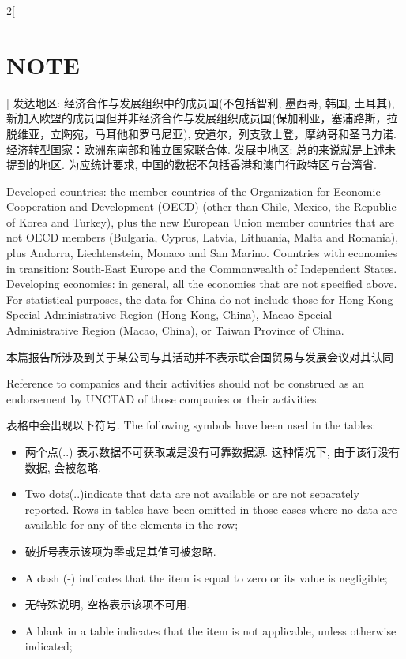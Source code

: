 \documentclass[a4paper, UTF8, 12pt]{article}
\begin{document}
\begin{paracol}{2}[\section{NOTE}]
    \switchcolumn*
    发达地区: 经济合作与发展组织中的成员国(不包括智利, 墨西哥, 韩国, 土耳其), 新加入欧盟的成员国但并非经济合作与发展组织成员国(保加利亚，塞浦路斯，拉脱维亚，立陶宛，马耳他和罗马尼亚), 安道尔，列支敦士登，摩纳哥和圣马力诺. 经济转型国家：欧洲东南部和独立国家联合体.
    发展中地区: 总的来说就是上述未提到的地区. 为应统计要求, 中国的数据不包括香港和澳门行政特区与台湾省.


    \switchcolumn
    Developed countries: the member countries of the Organization for Economic Cooperation and Development (OECD) (other than Chile, Mexico, the Republic of Korea and Turkey), plus the new European Union member countries that are not OECD members (Bulgaria, Cyprus, Latvia, Lithuania, Malta and Romania), plus Andorra, Liechtenstein, Monaco and San Marino. Countries with economies in transition: South-East Europe and the Commonwealth of Independent States. Developing economies: in general, all the economies that are not specified above. For statistical purposes, the data for China do not include those for Hong Kong Special Administrative Region (Hong Kong, China), Macao Special Administrative Region (Macao, China), or Taiwan Province of China. 

    \switchcolumn*
    本篇报告所涉及到关于某公司与其活动并不表示联合国贸易与发展会议对其认同

    \switchcolumn
    Reference to companies and their activities should not be construed as an endorsement by UNCTAD of those companies or their activities.

    \switchcolumn*
    表格中会出现以下符号.
    \switchcolumn
    The following symbols have been used in the tables: 

    \begin{itemize}
        \switchcolumn*
        \item 两个点(..) 表示数据不可获取或是没有可靠数据源. 这种情况下, 由于该行没有数据, 会被忽略.
        \switchcolumn
        \item Two dots(..)indicate that data are not available or are not separately reported. Rows in tables have been omitted in those cases where no data are available for any of the elements in the row; 
        
        \switchcolumn*
        \item 破折号表示该项为零或是其值可被忽略.
        \switchcolumn
        \item A dash (-) indicates that the item is equal to zero or its value is negligible;
        
        \switchcolumn*
        \item 无特殊说明, 空格表示该项不可用.
        \switchcolumn
        \item A blank in a table indicates that the item is not applicable, unless otherwise indicated; 
        

\end{itemize}
\end{paracol}
\end{document}
